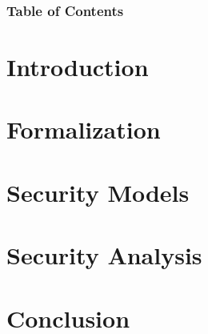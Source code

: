 




\usepackage[
    backend=biber,
    style=alphabetic,
    sorting=ynt
]{biblatex}


\renewcommand*{\bibfont}{\scriptsize}





\begin{frame}
\maketitle
\end{frame}


\begin{frame}
\frametitle{Table of Contents}
\tableofcontents[hideothersubsections]

\end{frame}

\section{Introduction}



\section{Formalization}



\section{Security Models}



\section{Security Analysis}



\section{Conclusion}

